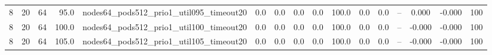 \begin{tabular}{r r r r l c c c c c c c c c c r}
8 & 20 & 64 & 95.0 & nodes64\_pods512\_prio1\_util095\_timeout20 & 0.0 & 0.0 & 0.0 & 0.0 & 100.0 & 0.0 & 0.0 & -- & 0.000 & -0.000 & 100 \\
8 & 20 & 64 & 100.0 & nodes64\_pods512\_prio1\_util100\_timeout20 & 0.0 & 0.0 & 0.0 & 0.0 & 100.0 & 0.0 & 0.0 & -- & -0.000 & -0.000 & 100 \\
8 & 20 & 64 & 105.0 & nodes64\_pods512\_prio1\_util105\_timeout20 & 0.0 & 0.0 & 0.0 & 0.0 & 100.0 & 0.0 & 0.0 & -- & -0.000 & -0.000 & 100 \\
\bottomrule
\end{tabular}
